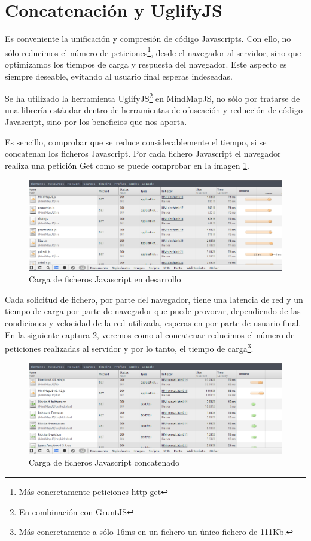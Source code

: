 \section{Concatenación y UglifyJS}
Es conveniente la unificación y compresión de código Javascripts. Con ello, no sólo reducimos el número de peticiones\footnote{Más concretamente peticiones http get}, desde el navegador al servidor, sino que optimizamos los tiempos de carga y respuesta del navegador. Este aspecto es siempre deseable, evitando al usuario final esperas indeseadas.  

Se ha utilizado la herramienta UglifyJS\footnote{En combinación con GruntJS} en MindMapJS, no sólo por tratarse de una librería estándar dentro de herramientas de ofuscación y reducción de código Javascript, sino por los beneficios que nos aporta.

Es sencillo, comprobar que se reduce considerablemente el tiempo, si se concatenan los ficheros Javascript. Por cada fichero Javascript el navegador realiza una petición Get como se puede comprobar en la imagen \ref{fig:carga-desarrollo}.  

\begin{figure}[tbph]
\centering
\includegraphics[width=0.9\linewidth]{imagenes/Uglify1.png}
\caption{Carga de ficheros Javascript en desarrollo}
\label{fig:carga-desarrollo}
\end{figure}

Cada solicitud de fichero, por parte del navegador, tiene una latencia de red y un tiempo de carga por parte de navegador que puede provocar, dependiendo de las condiciones y velocidad de la red utilizada, esperas en por parte de usuario final. En la siguiente captura \ref{fig:carga-concatenado}, veremos como al concatenar reducimos el número de peticiones realizadas al servidor y por lo tanto, el tiempo de carga\footnote{Más concretamente a sólo 16ms en un fichero un único fichero de 111Kb.}.

\begin{figure}[tbph]
\centering
\includegraphics[width=0.9\linewidth]{imagenes/Uglify2.png}
\caption{Carga de ficheros Javascript concatenado}
\label{fig:carga-concatenado}
\end{figure}

